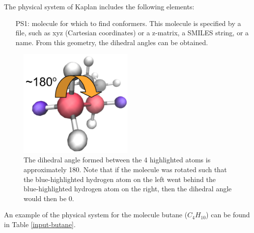 \documentclass[12pt]{article}
\newcommand{\progname}{Kaplan} %
\begin{document}
The physical system of \progname{} includes the following elements:

\begin{itemize}

\item[PS1:] molecule for which to find conformers. This molecule is specified 
by a file, such as xyz (Cartesian coordinates) or a 
z-matrix, a SMILES string, 
or a name. From this geometry, the dihedral angles can be obtained.

\end{itemize}

\begin{figure}[H]
	\begin{center}
	\includegraphics[width=0.5\textwidth]{butane-dihedral}
	\end{center}
	\caption{The dihedral angle formed between the 4 highlighted atoms is 
	approximately 180\textdegree. Note that if the molecule was rotated such 
	that the blue-highlighted hydrogen atom on the left went behind the 
	blue-highlighted hydrogen atom on the right, then the dihedral angle would 
	then be 0\textdegree.}
	\label{butane-dihedral}
\end{figure}

An example of the physical system for the molecule butane ($C_4H_{10}$) can be 
found in Table \ref{input-butane}.
\end{document}
